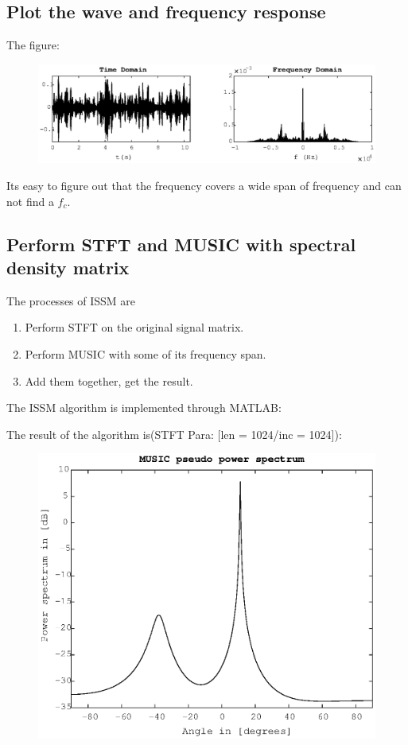 \documentclass[UTF8]{article}
\begin{document}
\subsection{Plot the wave and frequency response}
The figure:
\begin{figure}[H]
    \centering 
    \includegraphics[scale=0.7]{img/fig03.eps}\\
\end{figure}
Its easy to figure out that the frequency covers a wide span of frequency and can not find a $f_c$.

\subsection{Perform STFT and MUSIC with spectral density matrix}
\hspace{0.5em} The processes of ISSM are
\begin{enumerate}
    \item Perform STFT on the original signal matrix.
    \item Perform MUSIC with some of its frequency span.
    \item Add them together, get the result.
\end{enumerate}

The ISSM algorithm is implemented through MATLAB:



The result of the algorithm is(STFT Para: [len = 1024/inc = 1024]):

\begin{figure}[H]
    \centering
    \includegraphics[scale=0.7]{img/fig04.eps} \\
\end{figure}
\end{document}
